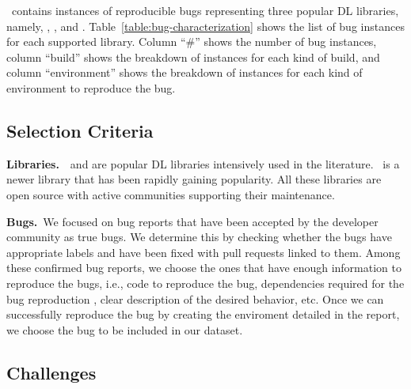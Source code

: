 \documentclass[sigconf,screen]{acmart}
\begin{document}
\tname\ contains \numbugs{} instances of reproducible bugs
representing three popular DL libraries, namely, \jax, \tf, and
\torch. Table~\ref{table:bug-characterization} shows the list of bug
instances for each supported library. Column ``\#'' shows the number
of bug instances, column ``build'' shows the breakdown of instances
for each kind of build, and column ``environment'' shows the breakdown
of instances for each kind of environment to reproduce the bug.

\subsection{Selection Criteria}
\label{sec:selection-criterion}


\textbf{Libraries.}~\torch~and \tf are popular DL libraries
intensively used in the literature. \jax\ is a newer library that has
been rapidly gaining popularity. All these libraries are open source
with active communities supporting their maintenance.



\textbf{Bugs.}~We focused on bug reports that have been accepted by
the developer community as true bugs. We determine this by checking
whether the bugs have appropriate labels and have been fixed with pull
requests linked to them. Among these confirmed bug reports, we choose
the ones that have enough information to reproduce the bugs, i.e.,
code to reproduce the bug, dependencies required for the bug
reproduction
, clear description of the desired behavior,
etc. Once we can successfully reproduce the bug by creating the
enviroment detailed in the report, we choose the bug to be included in
our dataset.

\subsection{Challenges}
\label{sec:challenges}
\end{document}
